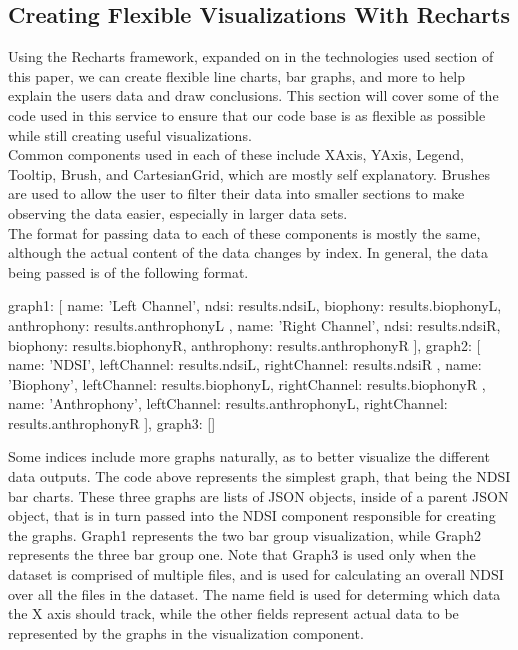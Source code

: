 \subsection{Creating Flexible Visualizations With Recharts}
Using the Recharts framework, expanded on in the technologies used section of this paper, we can create flexible line charts, bar graphs, and more to help explain the user\textquotesingle s data and draw conclusions. This section will cover some of the code used in this service to ensure that our code base is as flexible as possible while still creating useful visualizations.\\

\noindent Common components used in each of these include XAxis, YAxis, Legend, Tooltip, Brush, and CartesianGrid, which are mostly self explanatory. Brushes are used to allow the user to filter their data into smaller sections to make observing the data easier, especially in larger data sets.\\

\noindent The format for passing data to each of these components is mostly the same, although the actual content of the data changes by index. In general, the data being passed is of the following format.

\begin{javascriptcode}
{
  graph1: [
            {
              name: 'Left Channel',
              ndsi: results.ndsiL,
              biophony: results.biophonyL,
              anthrophony: results.anthrophonyL
            },
            {
              name: 'Right Channel',
              ndsi: results.ndsiR,
              biophony: results.biophonyR,
              anthrophony: results.anthrophonyR
            }
          ],
  graph2: [
            {
              name: 'NDSI',
              leftChannel: results.ndsiL,
              rightChannel: results.ndsiR
            },
            {
              name: 'Biophony',
              leftChannel: results.biophonyL,
              rightChannel: results.biophonyR
            },
            {
              name: 'Anthrophony',
              leftChannel: results.anthrophonyL,
              rightChannel: results.anthrophonyR
            }
          ],
  graph3: []
}
\end{javascriptcode}

\noindent Some indices include more graphs naturally, as to better visualize the different data outputs. The code above represents the simplest graph, that being the NDSI bar charts. These three graphs are lists of JSON objects, inside of a parent JSON object, that is in turn passed into the NDSI component responsible for creating the graphs. Graph1 represents the two bar group visualization, while Graph2 represents the three bar group one. Note that Graph3 is used only when the dataset is comprised of multiple files, and is used for calculating an overall NDSI over all the files in the dataset. The name field is used for determing which data the X axis should track, while the other fields represent actual data to be represented by the graphs in the visualization component.





